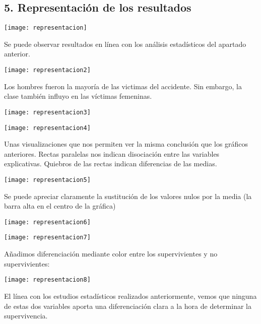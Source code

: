 \documentclass[12pt]{article}
\begin{document}
\hypertarget{representacion}{%
\subsection{5. Representación de los resultados}\label{representacion}}
\label{imagen}
  	\begin{center}
  	\texttt{[image: representacion]}
\end{center}

Se puede observar resultados en línea con los análisis estadísticos del apartado anterior. 
\label{imagen}
  	\begin{center}
  	\texttt{[image: representacion2]}
\end{center}
Los hombres fueron la mayoría de las victimas del accidente. Sin embargo, la clase también influyo en las víctimas femeninas.
\label{imagen}
  	\begin{center}
  	\texttt{[image: representacion3]}
\end{center}
\label{imagen}
  	\begin{center}
  	\texttt{[image: representacion4]}
\end{center}


Unas visualizaciones que nos permiten ver la misma conclusión que los gráficos anteriores. Rectas paralelas nos indican disociación entre las variables explicativas. Quiebros de las rectas indican diferencias de las medias.

\label{imagen}
  	\begin{center}
  	\texttt{[image: representacion5]}
\end{center}
Se puede apreciar claramente la sustitución de los valores nulos por la media (la barra alta en el centro de la gráfica)
\label{imagen}
  	\begin{center}
  	\texttt{[image: representacion6]}
\end{center}
\label{imagen}
  	\begin{center}
  	\texttt{[image: representacion7]}
\end{center}

Añadimos diferenciación mediante color entre los supervivientes y no supervivientes:
\label{imagen}
  	\begin{center}
  	\texttt{[image: representacion8]}
\end{center}

El línea con los estudios estadísticos realizados anteriormente, vemos que ninguna de estas dos variables aporta una diferenciación clara a la hora de determinar la supervivencia.
\end{document}
